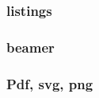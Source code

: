 \documentclass{cursuspresentatie}
\def\importslide#1#2{%
	{#2}
}
\begin{document}
	\begin{frame}
		\frametitle{listings}
	\end{frame}

	\begin{frame}
		\frametitle{beamer}
	\end{frame}

	\begin{frametitle}
		\frametitle{Pdf, svg, png}
	\end{frametitle}















	










\end{document}
